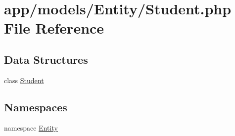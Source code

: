 \hypertarget{_student_8php}{\section{app/models/\-Entity/\-Student.php File Reference}
\label{_student_8php}
}
\subsection*{Data Structures}
\begin{DoxyCompactItemize}
\item 
class \hyperlink{class_entity_1_1_student}{Student}
\end{DoxyCompactItemize}
\subsection*{Namespaces}
\begin{DoxyCompactItemize}
\item 
namespace \hyperlink{namespace_entity}{Entity}
\end{DoxyCompactItemize}
